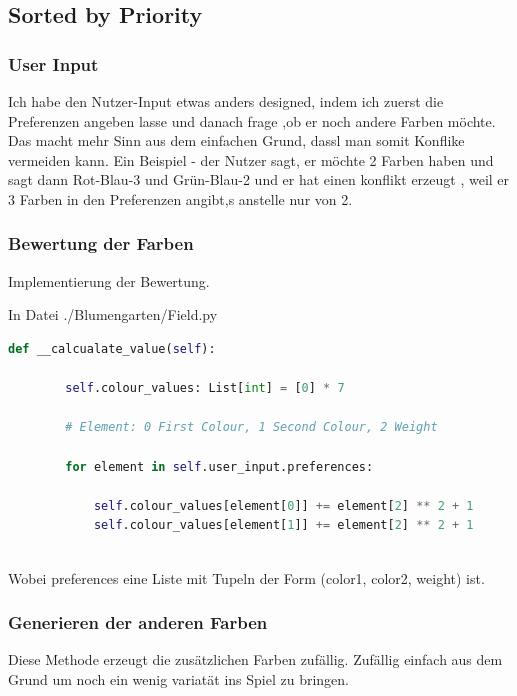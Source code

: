 \documentclass{article}
\begin{document}
\newpage

\subsection{Sorted by Priority}

\subsubsection{ User Input }

Ich habe den Nutzer-Input etwas anders designed, indem ich zuerst die Preferenzen angeben lasse und danach frage ,ob er noch andere Farben möchte. Das macht mehr Sinn aus dem einfachen Grund, dassl man somit Konflike vermeiden kann. Ein Beispiel - der Nutzer sagt, er möchte 2 Farben haben und sagt dann Rot-Blau-3 und Grün-Blau-2 und er hat einen konflikt erzeugt , weil er 3 Farben in den Preferenzen angibt,s anstelle nur von 2.


\subsubsection{Bewertung der Farben}

Implementierung der Bewertung. \newline

In Datei ./Blumengarten/Field.py
\begin{lstlisting}[language=Python]
    def __calcualate_value(self):

        self.colour_values: List[int] = [0] * 7

        # Element: 0 First Colour, 1 Second Colour, 2 Weight

        for element in self.user_input.preferences:

            self.colour_values[element[0]] += element[2] ** 2 + 1
            self.colour_values[element[1]] += element[2] ** 2 + 1	
	
\end{lstlisting}

Wobei preferences eine Liste mit Tupeln der Form (color1, color2, weight) ist.

\subsubsection{Generieren der anderen Farben}

Diese Methode erzeugt die zusätzlichen Farben zufällig. Zufällig einfach aus dem Grund um noch ein wenig variatät ins Spiel zu bringen.
\end{document}
